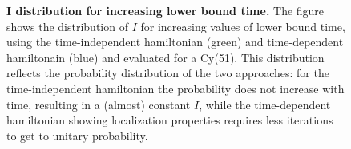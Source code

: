 

\begin{figure}[ht]
  \centering
  \caption[$I$ distribution for increasing lower bound time.]{\textbf{$\bm{I}$ distribution for increasing lower bound time. }The figure shows the distribution of $I$ for increasing values of lower bound time, using the time-independent hamiltonian (green) and time-dependent hamiltonain (blue) and evaluated for a Cy(51). This distribution reflects the probability distribution of the two approaches: for the time-independent hamiltonian the probability does not increase with time, resulting in a (almost) constant $I$, while the time-dependent hamiltonian showing localization properties requires less iterations to get to unitary probability.}
  \label{fig:iters_increasing_time}
\end{figure}
